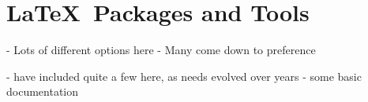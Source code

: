 \section{\LaTeX\ Packages and Tools}

- Lots of different options here
- Many come down to preference

- have included quite a few here, as needs evolved over years
- some basic documentation

